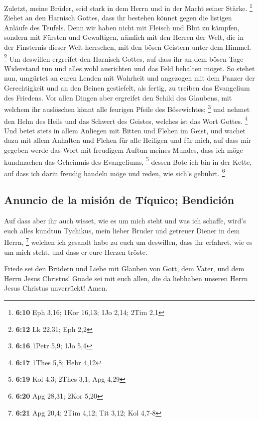  Zuletzt, meine Brüder, seid stark in dem Herrn und in
der Macht seiner Stärke. \footnote{\textbf{6:10} Eph 3,16; 1Kor 16,13;
  1Jo 2,14; 2Tim 2,1}  Ziehet an den Harnisch Gottes,
dass ihr bestehen könnet gegen die listigen Anläufe des Teufels.
 Denn wir haben nicht mit Fleisch und Blut zu kämpfen,
sondern mit Fürsten und Gewaltigen, nämlich mit den Herren der Welt, die
in der Finsternis dieser Welt herrschen, mit den bösen Geistern unter
dem Himmel. \footnote{\textbf{6:12} Lk 22,31; Eph 2,2} 
Um deswillen ergreifet den Harnisch Gottes, auf dass ihr an dem bösen
Tage Widerstand tun und alles wohl ausrichten und das Feld behalten
möget.  So stehet nun, umgürtet an euren Lenden mit
Wahrheit und angezogen mit dem Panzer der Gerechtigkeit 
und an den Beinen gestiefelt, als fertig, zu treiben das Evangelium des
Friedens.  Vor allen Dingen aber ergreifet den Schild des
Glaubens, mit welchem ihr auslöschen könnt alle feurigen Pfeile des
Bösewichtes; \footnote{\textbf{6:16} 1Petr 5,9; 1Jo 5,4} 
und nehmet den Helm des Heils und das Schwert des Geistes, welches ist
das Wort Gottes. \footnote{\textbf{6:17} 1Thes 5,8; Hebr 4,12}
 Und betet stets in allem Anliegen mit Bitten und Flehen
im Geist, und wachet dazu mit allem Anhalten und Flehen für alle
Heiligen  und für mich, auf dass mir gegeben werde das
Wort mit freudigem Auftun meines Mundes, dass ich möge kundmachen das
Geheimnis des Evangeliums, \footnote{\textbf{6:19} Kol 4,3; 2Thes 3,1;
  Apg 4,29}  dessen Bote ich bin in der Kette, auf dass
ich darin freudig handeln möge und reden, wie sich's gebührt.
\footnote{\textbf{6:20} Apg 28,31; 2Kor 5,20}

\hypertarget{anuncio-de-la-misiuxf3n-de-tuxedquico-bendiciuxf3n}{%
\subsection{Anuncio de la misión de Tíquico;
Bendición}\label{anuncio-de-la-misiuxf3n-de-tuxedquico-bendiciuxf3n}}

 Auf dass aber ihr auch wisset, wie es um mich steht und
was ich schaffe, wird's euch alles kundtun Tychikus, mein lieber Bruder
und getreuer Diener in dem Herrn, \footnote{\textbf{6:21} Apg 20,4; 2Tim
  4,12; Tit 3,12; Kol 4,7-8}  welchen ich gesandt habe zu
euch um deswillen, dass ihr erfahret, wie es um mich steht, und dass er
eure Herzen tröste.

 Friede sei den Brüdern und Liebe mit Glauben von Gott,
dem Vater, und dem Herrn Jesus Christus!  Gnade sei mit
euch allen, die da liebhaben unseren Herrn Jesus Christus unverrückt!
Amen.

